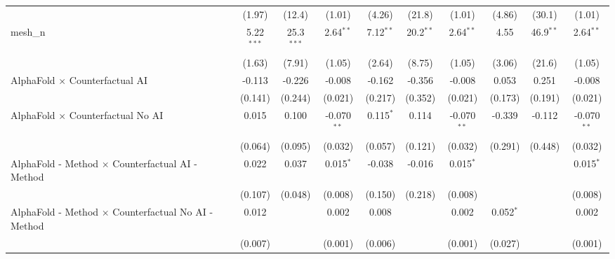 \begin{tabular}{lccccccccc}
                                                               & (1.97)         & (12.4)        & (1.01)         & (4.26)         & (21.8)       & (1.01)         & (4.86)        & (30.1)        & (1.01)\\   
   mesh\_n                                                     & 5.22$^{***}$   & 25.3$^{***}$  & 2.64$^{**}$    & 7.12$^{**}$    & 20.2$^{**}$  & 2.64$^{**}$    & 4.55          & 46.9$^{**}$   & 2.64$^{**}$\\   
                                                               & (1.63)         & (7.91)        & (1.05)         & (2.64)         & (8.75)       & (1.05)         & (3.06)        & (21.6)        & (1.05)\\   
   AlphaFold $\times$ Counterfactual AI                        & -0.113         & -0.226        & -0.008         & -0.162         & -0.356       & -0.008         & 0.053         & 0.251         & -0.008\\   
                                                               & (0.141)        & (0.244)       & (0.021)        & (0.217)        & (0.352)      & (0.021)        & (0.173)       & (0.191)       & (0.021)\\   
   AlphaFold $\times$ Counterfactual No AI                     & 0.015          & 0.100         & -0.070$^{**}$  & 0.115$^{*}$    & 0.114        & -0.070$^{**}$  & -0.339        & -0.112        & -0.070$^{**}$\\   
                                                               & (0.064)        & (0.095)       & (0.032)        & (0.057)        & (0.121)      & (0.032)        & (0.291)       & (0.448)       & (0.032)\\   
   AlphaFold - Method $\times$ Counterfactual AI - Method      & 0.022          & 0.037         & 0.015$^{*}$    & -0.038         & -0.016       & 0.015$^{*}$    &               &               & 0.015$^{*}$\\   
                                                               & (0.107)        & (0.048)       & (0.008)        & (0.150)        & (0.218)      & (0.008)        &               &               & (0.008)\\   
   AlphaFold - Method $\times$ Counterfactual No AI - Method   & 0.012          &               & 0.002          & 0.008          &              & 0.002          & 0.052$^{*}$   &               & 0.002\\   
                                                               & (0.007)        &               & (0.001)        & (0.006)        &              & (0.001)        & (0.027)       &               & (0.001)\\   

\end{tabular}
